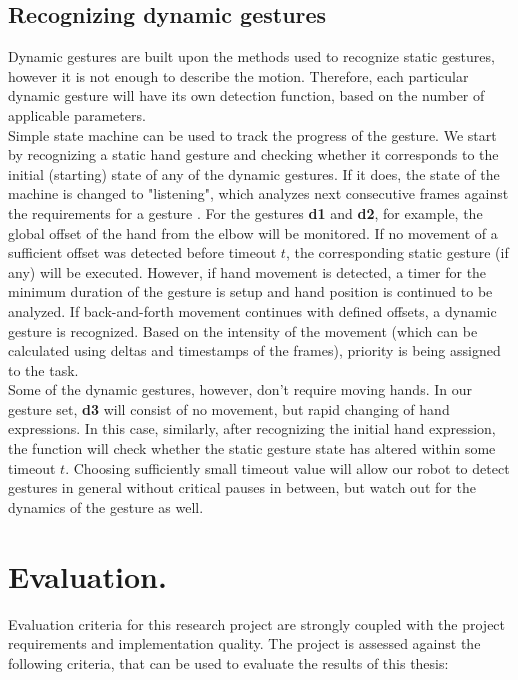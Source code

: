 \documentclass[a4paper,11pt,oneside]{article}
\begin{document}
\subsection{Recognizing dynamic gestures}
  
Dynamic gestures are built upon the methods used to recognize static gestures, however it is not enough to describe the motion. Therefore, each particular dynamic gesture will have its own detection function, based on the number of applicable parameters.\\

Simple state machine can be used to track the progress of the gesture. We start by recognizing a static hand gesture and checking whether it corresponds to the initial (starting) state of any of the dynamic gestures. If it does, the state of the machine is changed to "listening", which analyzes next consecutive frames against the requirements for a gesture . For the gestures \textbf{d1} and \textbf{d2}, for example, the global offset of the hand from the elbow will be monitored. If no movement of a sufficient offset was detected before timeout $t$, the corresponding static gesture (if any) will be executed. However, if hand movement is detected, a timer for the minimum duration of the gesture is setup and hand position is continued to be analyzed. If back-and-forth movement continues with defined offsets, a dynamic gesture is recognized. Based on the intensity of the movement (which can be calculated using deltas and timestamps of the frames), priority is being assigned to the task.\\

Some of the dynamic gestures, however, don't require moving hands. In our gesture set, \textbf{d3} will consist of no movement, but rapid changing of hand expressions. In this case, similarly, after recognizing the initial hand expression, the function will check whether the static gesture state has altered within some timeout $t$. Choosing sufficiently small timeout value will allow our robot to detect gestures in general without critical pauses in between, but watch out for the dynamics of the gesture as well.
  
  \section{Evaluation.}
  
 Evaluation criteria for this research project are strongly coupled with the project requirements and implementation quality. The project is assessed against the following criteria, that can be used to evaluate the results of this thesis:
  
\end{document}
